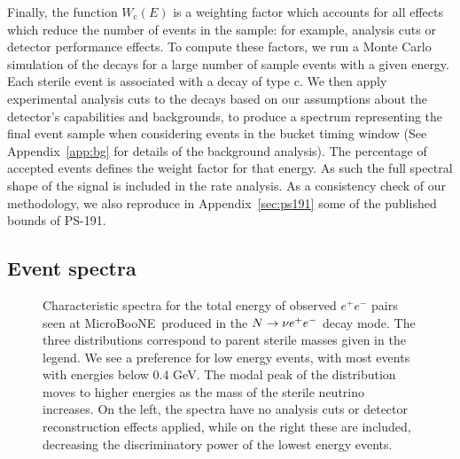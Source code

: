 \documentclass[11pt, a4paper]{article}
\newcommand{\refapp}[1]{Appendix~\ref{#1}}
\def\muboone{MicroBooNE}
\def\ster{\ensuremath N}
\begin{document}
%
Finally, the function $W_\text{c}(E)$ is a weighting factor which accounts for
all effects which reduce the number of events in the sample: for example,
analysis cuts or detector performance effects.
%
To compute these factors, we run a Monte Carlo simulation of the decays for a
large number of sample events with a given energy. Each sterile event is
associated with a decay of type $\text{c}$. We then apply experimental analysis
cuts to the decays based on our assumptions about the detector's capabilities
and backgrounds, to produce a spectrum representing the final event sample when
considering events in the bucket timing window (See \refapp{app:bg} for
details of the background analysis). The percentage of accepted events defines
the weight factor for that energy. As such the full spectral shape of the
signal is included in the rate analysis. As a consistency check of our
methodology, we also reproduce in \refapp{sec:ps191} some of the published
bounds of PS-191. 


\subsection{\label{sec:eventspectra}Event spectra}

%
\begin{figure}[t]
%
\center
%
\large

\resizebox{\columnwidth}{!}{}
%
\caption{\label{fig:spectrum_ee} Characteristic spectra for the total energy of observed  $e^+e^-$ pairs seen at \muboone\ produced in the $\ster \to \nu e^+e^-$ decay mode. The three distributions correspond to parent sterile masses given in the legend. We see a preference for low energy events, with most events with energies below $0.4$ GeV. The modal peak of the distribution moves to higher energies as the mass of the sterile neutrino increases. On the left, the spectra have no analysis cuts or detector reconstruction effects applied, while on the right these are included, decreasing the discriminatory power of the lowest energy events.}
%
\end{figure}
\end{document}
